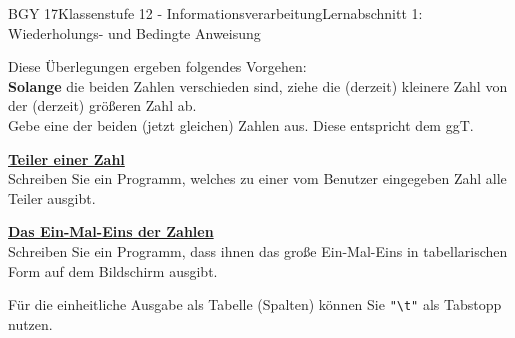 \documentclass[oneside,openany,headings=optiontotoc,11pt,numbers=noenddot]{scrreprt}
\begin{document}
\begin{worksheet}{BGY 17}{Klassenstufe 12 - Informationsverarbeitung}{Lernabschnitt 1: Wiederholungs- und Bedingte Anweisung}
\begin{framed}
\begin{framed}
\begin{itemize}[label=-]
				\end{itemize}
				Diese Überlegungen ergeben folgendes Vorgehen:\\
				\indent\textbf{Solange} die beiden Zahlen verschieden sind, ziehe die (derzeit) kleinere Zahl von der (derzeit) größeren Zahl ab.\\
				Gebe eine der beiden (jetzt gleichen) Zahlen aus. Diese entspricht dem ggT.
			\end{framed}
			\par\bigskip\noindent
			\textbf{\underline{Teiler einer Zahl}}\\
			Schreiben Sie ein Programm, welches zu einer vom Benutzer eingegeben Zahl alle Teiler ausgibt.
			\par\bigskip\noindent
			\textbf{\underline{Das Ein-Mal-Eins der Zahlen}}\\
			Schreiben Sie ein Programm, dass ihnen das große Ein-Mal-Eins in tabellarischen Form auf dem Bildschirm ausgibt.\\
			\par\noindent
			\small{Für die einheitliche Ausgabe als Tabelle (Spalten) können Sie \lstinline[style=JavaInputStyle]{"\t"} als Tabstopp nutzen.}
		\end{framed}
	\end{worksheet}
\end{document}
